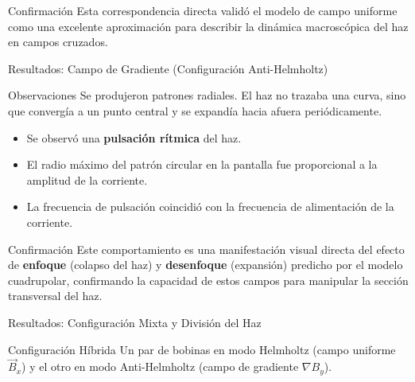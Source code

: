 \documentclass{beamer}
\begin{document}
\begin{frame}
  \begin{alertblock}{Confirmación}
    Esta correspondencia directa validó el modelo de campo uniforme como una excelente aproximación para describir la dinámica macroscópica del haz en campos cruzados.
  \end{alertblock}
\end{frame}

\begin{frame}{Resultados: Campo de Gradiente (Configuración Anti-Helmholtz)}
  \begin{block}{Observaciones}
    Se produjeron patrones radiales. El haz no trazaba una curva, sino que convergía a un punto central y se expandía hacia afuera periódicamente.
  \end{block}

  \begin{itemize}
    \item Se observó una \textbf{pulsación rítmica} del haz.
    \item El radio máximo del patrón circular en la pantalla fue proporcional a la amplitud de la corriente.
    \item La frecuencia de pulsación coincidió con la frecuencia de alimentación de la corriente.
  \end{itemize}

  \begin{alertblock}{Confirmación}
    Este comportamiento es una manifestación visual directa del efecto de \textbf{enfoque} (colapso del haz) y \textbf{desenfoque} (expansión) predicho por el modelo cuadrupolar, confirmando la capacidad de estos campos para manipular la sección transversal del haz.
  \end{alertblock}
\end{frame}

\begin{frame}{Resultados: Configuración Mixta y División del Haz}
  \begin{block}{Configuración Híbrida}
    Un par de bobinas en modo Helmholtz (campo uniforme $\vec{B}_x$) y el otro en modo Anti-Helmholtz (campo de gradiente $\nabla B_y$).
  \end{block}

\end{frame}
\end{document}
